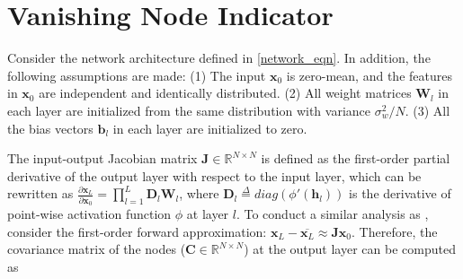 
\section{Vanishing Node Indicator} \label{initial}

Consider the network architecture defined in \eqref{network_eqn}. In addition, the following assumptions are
made: (1) The input $\mathbf{x}_0$ is zero-mean, and the features in $\mathbf{x}_0$ are independent and
identically distributed. (2) All weight matrices $\mathbf{W}_l$ in each layer are initialized from the same
distribution with variance $\sigma_w^2/N$. (3) All the bias vectors $\mathbf{b}_l$ in each layer are
initialized to zero.


The input-output Jacobian matrix $\mathbf{J}\in\mathbb{R}^{N\times N}$  is defined as the first-order partial derivative of the output layer with respect to the input layer, which can be rewritten as $\frac{\partial\mathbf{x}_L}{\partial\mathbf{x}_0}=\prod_{l=1}^{L}\mathbf{D}_l\mathbf{W}_l$,
where $\mathbf{D}_l\overset{\Delta}{=} diag(\phi'(\mathbf{h}_l))$ is the derivative of point-wise activation function $\phi$ at layer $l$.
To conduct a similar analysis as \cite{mft:linear}, consider the first-order forward approximation:
$\mathbf{x}_L-\overline{\mathbf{x}_L} \approx \mathbf{Jx}_0$. Therefore, the covariance matrix of the nodes ($\mathbf{C}\in\mathbb{R}^{N\times N}$) at the output layer  can be computed as

